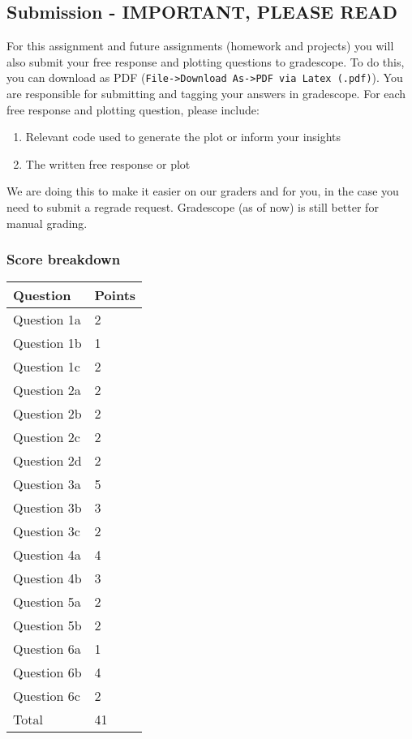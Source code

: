 \documentclass[11pt]{article}
\providecommand{\tightlist}{%
      \setlength{\itemsep}{0pt}\setlength{\parskip}{0pt}}
\begin{document}
\subsection{Submission - IMPORTANT, PLEASE
READ}\label{submission---important-please-read}

For this assignment and future assignments (homework and projects) you
will also submit your free response and plotting questions to
gradescope. To do this, you can download as PDF
(\texttt{File-\textgreater{}Download\ As-\textgreater{}PDF\ via\ Latex\ (.pdf)}).
You are responsible for submitting and tagging your answers in
gradescope. For each free response and plotting question, please
include:

\begin{enumerate}
\def\labelenumi{\arabic{enumi}.}
\tightlist
\item
  Relevant code used to generate the plot or inform your insights
\item
  The written free response or plot
\end{enumerate}

We are doing this to make it easier on our graders and for you, in the
case you need to submit a regrade request. Gradescope (as of now) is
still better for manual grading.

\subsubsection{Score breakdown}\label{score-breakdown}

\begin{longtable}[]{@{}ll@{}}
\toprule
Question & Points\tabularnewline
\midrule
\endhead
Question 1a & 2\tabularnewline
Question 1b & 1\tabularnewline
Question 1c & 2\tabularnewline
Question 2a & 2\tabularnewline
Question 2b & 2\tabularnewline
Question 2c & 2\tabularnewline
Question 2d & 2\tabularnewline
Question 3a & 5\tabularnewline
Question 3b & 3\tabularnewline
Question 3c & 2\tabularnewline
Question 4a & 4\tabularnewline
Question 4b & 3\tabularnewline
Question 5a & 2\tabularnewline
Question 5b & 2\tabularnewline
Question 6a & 1\tabularnewline
Question 6b & 4\tabularnewline
Question 6c & 2\tabularnewline
Total & 41\tabularnewline
\bottomrule
\end{longtable}
\end{document}
